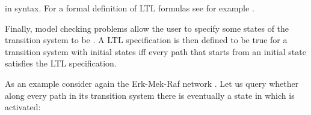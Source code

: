 \documentclass[letterpaper,10pt,english]{sphinxmanual}
\begin{document}
in {\hyperref[\detokenize{Installation:installation-nusmv}]{}} syntax.
For a formal definition of LTL formulas see for example {\hyperref[\detokenize{Bibliography:baier2008}]{}}.

Finally, model checking problems allow the user to specify some states of the transition system to be .
A LTL specification is then defined to be true for a transition system with initial states iff every path that starts from an initial state
satisfies the LTL specification.

As an example consider again the Erk-Mek-Raf network {\hyperref[\detokenize{Manual:figure17}]{}}.
Let us query whether along every path in its transition system there is eventually a state in which  is activated:

\begin{sphinxVerbatim}[commandchars=\\\{\}]
     
  
  
  
     
\end{sphinxVerbatim}
\end{document}
